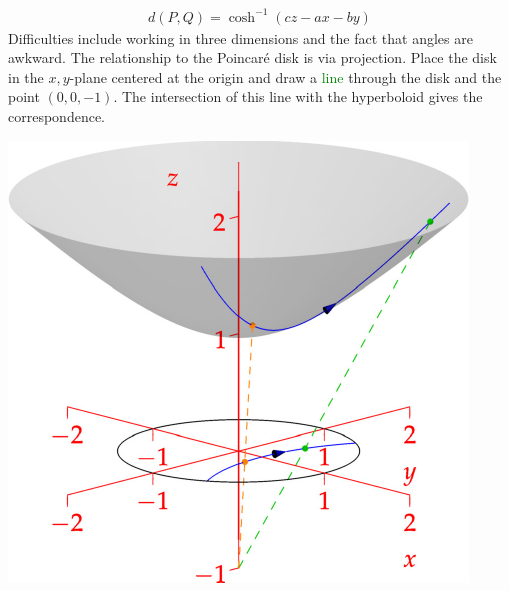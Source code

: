 \begin{minipage}[t]{0.6\linewidth}\vspace{-10pt}
\begin{gather*}
d(P,Q)=\cosh^{-1}(cz-ax-by)
\end{gather*}
Difficulties include working in three dimensions and the fact that angles are awkward.\smallbreak
The relationship to the Poincaré disk is via projection. Place the disk in the $x,y$-plane centered at the origin and draw a \textcolor{Green}{line} through the disk and the point $(0,0,-1)$. The intersection of this line with the hyperboloid gives the correspondence.
\end{minipage}\begin{minipage}[t]{0.4\linewidth}\vspace{0pt}
\flushright\href{http://www.math.uci.edu/~ndonalds/math161/hyper-plane.html}{\includegraphics[scale=0.8]{hyper-plane}}
\end{minipage}

